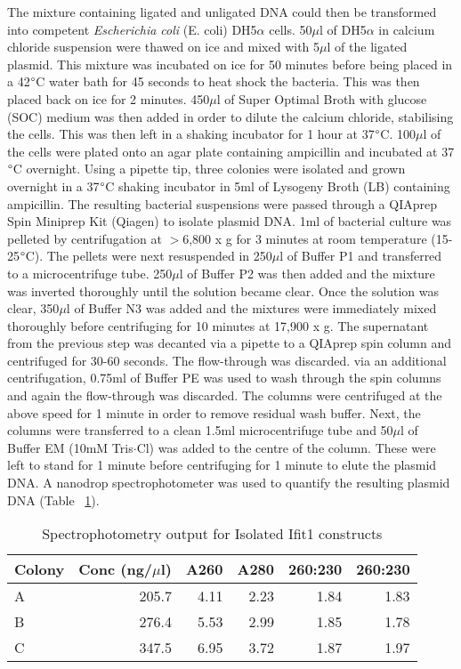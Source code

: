 The mixture containing ligated and unligated DNA could then be transformed into competent \textit{Escherichia coli} (E. coli) DH5$\alpha$ cells. 50$\mu$l of DH5$\alpha$ in calcium chloride suspension were thawed on ice and mixed with 5$\mu$l of the ligated plasmid. This mixture was incubated on ice for 50 minutes before being placed in a 42$\degree$C water bath for 45 seconds to heat shock the bacteria. This was then placed back on ice for 2 minutes. 450$\mu$l of Super Optimal Broth with glucose (SOC) medium was then added in order to dilute the calcium chloride, stabilising the cells. This was then left in a shaking incubator for 1 hour at 37$\degree$C. 100$\mu$l of the cells were plated onto an agar plate containing ampicillin and incubated at 37$\degree$C overnight. Using a pipette tip, three colonies were isolated and grown overnight in a 37$\degree$C shaking incubator in 5ml of Lysogeny Broth (LB) containing ampicillin. The resulting bacterial suspensions were passed through a QIAprep\textsuperscript{\textregistered} Spin Miniprep Kit (Qiagen) to isolate plasmid DNA. 1ml of bacterial culture was pelleted by centrifugation at $>$6,800 x g for 3 minutes at room temperature (15-25$\degree$C). The pellets were next resuspended in 250$\mu$l of Buffer P1 and transferred to a microcentrifuge tube. 250$\mu$l of Buffer P2 was then added and the mixture was inverted thoroughly until the solution became clear. Once the solution was clear, 350$\mu$l of Buffer N3 was added and the mixtures were immediately mixed thoroughly before centrifuging for 10 minutes at 17,900 x g. The supernatant from the previous step was decanted via a pipette to a QIAprep spin column and centrifuged for 30-60 seconds. The flow-through was discarded. via an additional centrifugation, 0.75ml of Buffer PE was used to wash through the spin columns and again the flow-through was discarded. The columns were centrifuged at the above speed for 1 minute in order to remove residual wash buffer. Next, the columns were transferred to a clean 1.5ml microcentrifuge tube and 50$\mu$l of Buffer EM (10mM Tris$\cdot$Cl) was added to the centre of the column. These were left to stand for 1 minute before centrifuging for 1 minute to elute the plasmid DNA. A nanodrop spectrophotometer was used to quantify the resulting plasmid DNA (Table ~\ref{tab:construct_nanodrop}). \\

\begin{table}[!htbp]
\centering
\footnotesize
\begin{tabular}{lrrrrr}
  
  Colony    & Conc (ng/$\mu$l)  & A260 & A280 & 260:230 & 260:230 \\
  \hline
  A         & 205.7             & 4.11 & 2.23 & 1.84    & 1.83  \\
  B         & 276.4             & 5.53 & 2.99 & 1.85    & 1.78  \\
  C         & 347.5             & 6.95 & 3.72 & 1.87    & 1.97  \\
\end{tabular}
\caption{Spectrophotometry output for Isolated Ifit1 constructs}
\label{tab:construct_nanodrop}
\end{table}

